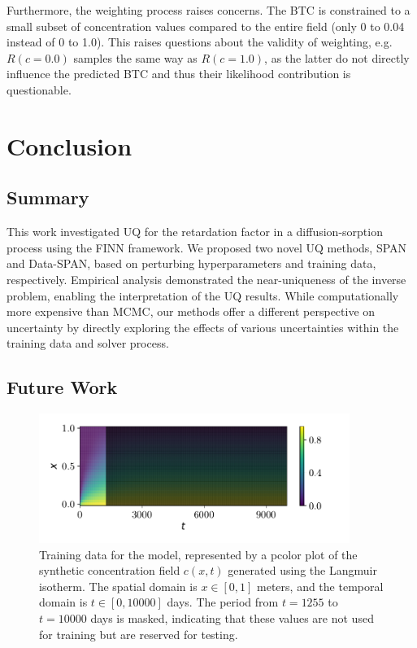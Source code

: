 Furthermore, the weighting process raises concerns. The BTC is constrained to a small subset of concentration values compared to the entire field (only 0 to 0.04 instead of 0 to 1.0). This raises questions about the validity of weighting, e.g. $R(c=0.0)$ samples the same way as $R(c=1.0)$, as the latter do not directly influence the predicted BTC and thus their likelihood contribution is questionable.


\section{Conclusion}
\subsection{Summary}
This work investigated UQ for the retardation factor in a diffusion-sorption process using the FINN framework. We proposed two novel UQ methods, SPAN and Data-SPAN, based on perturbing hyperparameters and training data, respectively. Empirical analysis demonstrated the near-uniqueness of the inverse problem, enabling the interpretation of the UQ results. While computationally more expensive than MCMC, our methods offer a different perspective on uncertainty by directly exploring the effects of various uncertainties within the training data and solver process.

\subsection{Future Work}






\begin{figure}
    \centering
    \includegraphics[width=0.9\textwidth]{figs/c_diss_field_full_black_test.pdf}
    \caption{Training data for the model, represented by a pcolor plot of the synthetic concentration field $c(x,t)$ generated using the Langmuir isotherm. The spatial domain is $x \in [0, 1]$ meters, and the temporal domain is $t \in [0, 10000]$ days. The period from $t = 1255$ to $t = 10000$ days is masked, indicating that these values are not used for training but are reserved for testing.}
    \label{fig:c_diss_field_full_black_test}
\end{figure}